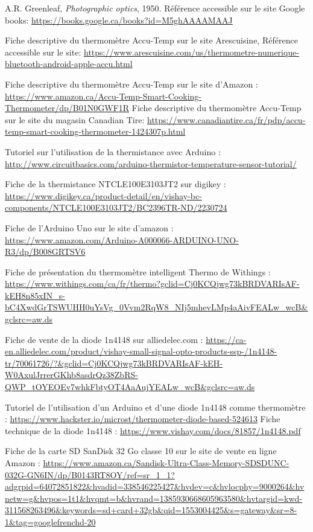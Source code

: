 \begin{thebibliographyUL}{9}
 A.R. Greenleaf, \emph{Photographic optics}, 1950. Référence accessible sur le site Google books: \url{https://books.google.ca/books?id=M5ghAAAAMAAJ}

 Fiche descriptive du thermomètre Accu-Temp sur le site Arescuisine, Référence accessible sur le site: \url{https://www.arescuisine.com/us/thermometre-numerique-bluetooth-android-apple-accu.html}

 Fiche descriptive du thermomètre Accu-Temp sur le site d'Amazon : \url{https://www.amazon.ca/Accu-Temp-Smart-Cooking-Thermometer/dp/B01N0GWF1R}
Fiche descriptive du thermomètre Accu-Temp sur le site du magasin Canadian Tire:
\url{https://www.canadiantire.ca/fr/pdp/accu-temp-smart-cooking-thermometer-1424307p.html}

 Tutoriel sur l’utilisation de la thermistance avec Arduino : 
\url{http://www.circuitbasics.com/arduino-thermistor-temperature-sensor-tutorial/}

 Fiche de la thermistance NTCLE100E3103JT2 sur digikey :
\url{https://www.digikey.ca/product-detail/en/vishay-bc-components/NTCLE100E3103JT2/BC2396TR-ND/2230724}

Fiche de l’Arduino Uno sur le site d’amazon :
\url{https://www.amazon.com/Arduino-A000066-ARDUINO-UNO-R3/dp/B008GRTSV6}

Fiche de présentation du thermomètre intelligent Thermo de Withings :
\url{https://www.withings.com/ca/fr/thermo?gclid=Cj0KCQjwg73kBRDVARIsAF-kEH8n85xIN_s-bC4XwdGrTSWUHH0uYsVg_0Vvm2RqW8_NIj5mhevLMp4aAivFEALw_wcB&gclsrc=aw.ds}

 Fiche de vente de la diode 1n4148 sur alliedelec.com :
\url{https://ca-en.alliedelec.com/product/vishay-small-signal-opto-products-ssp-/1n4148-tr/70061726/?&gclid=Cj0KCQjwg73kBRDVARIsAF-kEH-W0AxulJrrerGKhb8asdrQz38ZbRS-QWP_tOYEOEv7whkFbtyOT4AaAujYEALw_wcB&gclsrc=aw.ds}

 Tutoriel de l’utilisation d’un Arduino et d’une diode 1n4148 comme thermomètre :
\url{https://www.hackster.io/microst/thermometer-diode-based-524613}
 Fiche technique de la diode 1n4148 :
\url{https://www.vishay.com/docs/81857/1n4148.pdf}

 Fiche de la carte SD SanDisk 32 Go classe 10 sur le site de vente en ligne Amazon :
\url{https://www.amazon.ca/Sandisk-Ultra-Class-Memory-SDSDUNC-032G-GN6IN/dp/B0143RT8OY/ref=sr_1_1?adgrpid=64072851822&hvadid=338546225427&hvdev=c&hvlocphy=9000264&hvnetw=g&hvpos=1t1&hvqmt=b&hvrand=1385930668605963580&hvtargid=kwd-311568263496&keywords=sd+card+32gb&qid=1553004425&s=gateway&sr=8-1&tag=googlefrenchd-20}


\end{thebibliographyUL}
